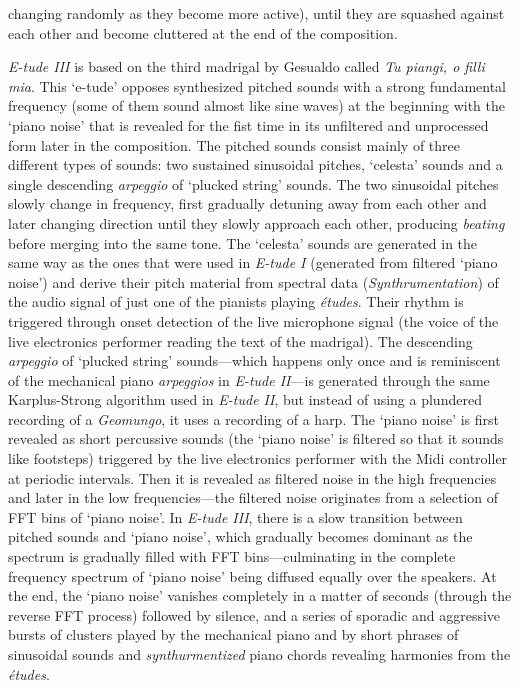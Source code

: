 changing randomly as they become more active), until they are squashed against each other and become cluttered at the end of the composition.

\emph{E-tude III} is based on the third madrigal by Gesualdo called \emph{Tu piangi, o filli mia}. This `e-tude' opposes synthesized pitched sounds with a strong fundamental frequency (some of them sound almost like sine waves) at the beginning with the `piano noise' that is revealed for the fist time in its unfiltered and unprocessed form later in the composition. The pitched sounds consist mainly of three different types of sounds: two sustained sinusoidal pitches, `celesta' sounds and a single descending \emph{arpeggio} of `plucked string' sounds. The two sinusoidal pitches slowly change in frequency, first gradually detuning away from each other and later changing direction until they slowly approach each other, producing \emph{beating} before merging into the same tone. The `celesta' sounds are generated in the same way as the ones that were used in \emph{E-tude I} (generated from filtered `piano noise') and derive their pitch material from spectral data (\emph{Synthrumentation}) of the audio signal of just one of the pianists playing \emph{\'{e}tudes}. Their rhythm is triggered through onset detection of the live microphone signal (the voice of the live electronics performer reading the text of the madrigal). The descending \emph{arpeggio} of `plucked string' sounds---which happens only once and is reminiscent of the mechanical piano \emph{arpeggios} in \emph{E-tude II}---is generated through the same Karplus-Strong algorithm used in \emph{E-tude II}, but instead of using a plundered recording of a \emph{Geomungo}, it uses a recording of a harp. The `piano noise' is first revealed as short percussive sounds (the `piano noise' is filtered so that it sounds like footsteps) triggered by the live electronics performer with the Midi controller at periodic intervals. Then it is revealed as filtered noise in the high frequencies and later in the low frequencies---the filtered noise originates from a selection of FFT bins of `piano noise'. In \emph{E-tude III}, there is a slow transition between pitched sounds and `piano noise', which gradually becomes dominant as the spectrum is gradually filled with FFT bins---culminating in the complete frequency spectrum of `piano noise' being diffused equally over the speakers. At the end, the `piano noise' vanishes completely in a matter of seconds (through the reverse FFT process) followed by silence, and a series of sporadic and aggressive bursts of clusters played by the mechanical piano and by short phrases of sinusoidal sounds and \emph{synthurmentized} piano chords revealing harmonies from the \emph{\'{e}tudes}. 

